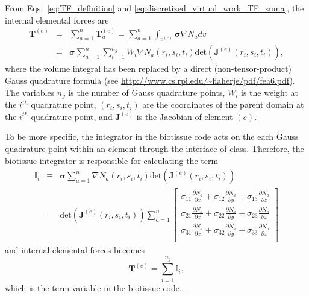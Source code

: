 From Eqs.\ \eqref{eq:TF_definition} and \eqref{eq:discretized_virtual_work_TF_suma}, the internal elemental forces are
%
\begin{eqnarray}
\pmb{T}^{(e)} &=& \sum_{a=1}^n \pmb{T}^{(e)}_a = \sum_{a=1}^n\int_{v^{(e)}} \pmb{\sigma}\nabla N_a dv \nonumber\\
%
&=& \pmb{\sigma} \sum_{a=1}^n  \sum_{i=1}^{n_{g}} W_{i}  \nabla N_a(r_i,s_i,t_i) \text{det}\left(\pmb{J}^{(e)}(r_i,s_i,t_i)\right),
\end{eqnarray}
%
where the volume integral has been replaced by a direct (non-tensor-product) Gauss quadrature formula (see \url{http://www.cs.rpi.edu/~flaherje/pdf/fea6.pdf}). The variables $n_{g}$ is the number of Gauss quadrature points, $W_i$ is the weight at the $i^{th}$ quadrature point, $(r_i, s_i,t_i)$ are the coordinates of the parent domain at the $i^{th}$ quadrature point, and $\pmb{J}^{(e)}$ is the Jacobian of element $(e)$.

To be more specific, the integrator in the biotissue code acts on the each Gauss quadrature point within an element through the  interface of  class. Therefore, the biotissue integrator is responsible for calculating the term
%
\begin{eqnarray}
\pmb{\mathbb{I}}_i &\equiv& \pmb{\sigma} \sum_{a=1}^n  \nabla N_a(r_i,s_i,t_i) \text{det}\left(\pmb{J}^{(e)}(r_i,s_i,t_i)\right) \nonumber\\
&=&\text{det}\left(\pmb{J}^{(e)}(r_i,s_i,t_i)\right) \sum_{a=1}^n 
\begin{bmatrix}
\sigma_{11} \frac{\partial N_a}{\partial x} + \sigma_{12} \frac{\partial N_a}{\partial y} + \sigma_{13} \frac{\partial N_a}{\partial z} \\
%
\sigma_{21} \frac{\partial N_a}{\partial x} + \sigma_{22} \frac{\partial N_a}{\partial y} + \sigma_{23} \frac{\partial N_a}{\partial z} \\
%
\sigma_{31} \frac{\partial N_a}{\partial x} + \sigma_{32} \frac{\partial N_a}{\partial y} + \sigma_{33} \frac{\partial N_a}{\partial z} \\
\end{bmatrix} 
\end{eqnarray}
%
and internal elemental forces becomes
%
\begin{equation}
\pmb{T}^{(e)} = \sum_{i=1}^{n_g} \pmb{\mathbb{I}}_i ,
\end{equation}
%
which is the term  variable in the biotissue code. .